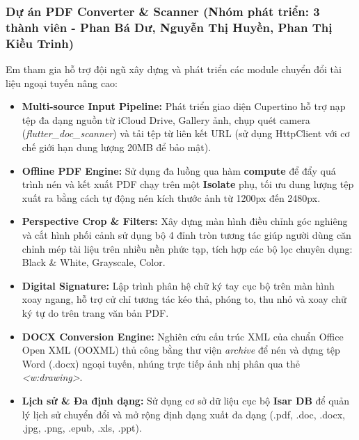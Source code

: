 \documentclass[12pt, a4paper]{article}
\begin{document}
\subsubsection{Dự án PDF Converter \& Scanner (Nhóm phát triển: 3 thành viên - Phan Bá Dư, Nguyễn Thị Huyền, Phan Thị Kiều Trinh)}
Em tham gia hỗ trợ đội ngũ xây dựng và phát triển các module chuyển đổi tài liệu ngoại tuyến nâng cao:
\begin{itemize}
    \item \textbf{Multi-source Input Pipeline:} Phát triển giao diện Cupertino hỗ trợ nạp tệp đa dạng nguồn từ iCloud Drive, Gallery ảnh, chụp quét camera (\textit{flutter\_doc\_scanner}) và tải tệp từ liên kết URL (sử dụng HttpClient với cơ chế giới hạn dung lượng 20MB để bảo mật).
    \item \textbf{Offline PDF Engine:} Sử dụng đa luồng qua hàm \textbf{compute} để đẩy quá trình nén và kết xuất PDF chạy trên một \textbf{Isolate} phụ, tối ưu dung lượng tệp xuất ra bằng cách tự động nén kích thước ảnh từ 1200px đến 2480px.
    \item \textbf{Perspective Crop \& Filters:} Xây dựng màn hình điều chỉnh góc nghiêng và cắt hình phối cảnh sử dụng bộ 4 đỉnh tròn tương tác giúp người dùng căn chỉnh mép tài liệu trên nhiều nền phức tạp, tích hợp các bộ lọc chuyên dụng: Black \& White, Grayscale, Color.
    \item \textbf{Digital Signature:} Lập trình phân hệ chữ ký tay cục bộ trên màn hình xoay ngang, hỗ trợ cử chỉ tương tác kéo thả, phóng to, thu nhỏ và xoay chữ ký tự do trên trang văn bản PDF.
    \item \textbf{DOCX Conversion Engine:} Nghiên cứu cấu trúc XML của chuẩn Office Open XML (OOXML) thủ công bằng thư viện \textit{archive} để nén và dựng tệp Word (.docx) ngoại tuyến, nhúng trực tiếp ảnh nhị phân qua thẻ \textit{<w:drawing>}.
    \item \textbf{Lịch sử \& Đa định dạng:} Sử dụng cơ sở dữ liệu cục bộ \textbf{Isar DB} để quản lý lịch sử chuyển đổi và mở rộng định dạng xuất đa dạng (.pdf, .doc, .docx, .jpg, .png, .epub, .xls, .ppt).
\end{itemize}
\end{document}
